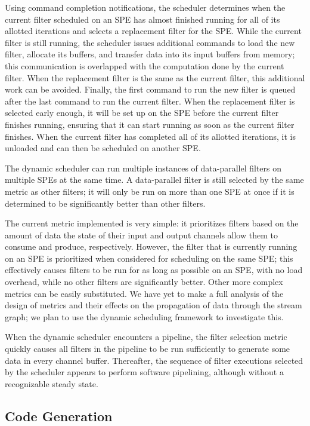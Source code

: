 Using command completion notifications,
the scheduler determines when the current filter scheduled on an SPE has
almost finished running for all of its allotted iterations and selects
a replacement filter for the SPE.
While the current filter is still running, the
scheduler issues additional commands to load the new filter, allocate
its buffers, and transfer data into its input buffers from memory;
this communication is overlapped with the computation done by the
current filter. When the replacement filter is the same as the current
filter, this additional work can be avoided. Finally, the first
command to run the new filter is queued after the last command to run
the current filter. When the replacement filter is selected early
enough, it will be set up on the SPE before the current filter
finishes running, ensuring that it can start running as soon as the
current filter finishes. When the current filter has completed all of
its allotted iterations, it is unloaded and can then be scheduled on
another SPE.

The dynamic scheduler can run multiple instances of data-parallel
filters on multiple SPEs at the same time. A data-parallel filter is
still selected by the same metric as other filters; it will only be
run on more than one SPE at once if it is determined to be significantly better than
other filters.

The current metric implemented is very simple: it prioritizes filters
based on the amount of data the state of their input and output
channels allow them to consume and produce, respectively. However, the
filter that is currently running on an SPE is prioritized when
considered for scheduling on the same SPE; this effectively causes
filters to be run for as long as possible on an SPE, with no load
overhead, while no other filters are significantly better. Other more
complex metrics can be easily substituted. We have yet to make a
full analysis of the design of metrics and their effects on the propagation
of data through the stream graph; we plan to use the dynamic scheduling
framework to investigate this.

When the dynamic scheduler encounters a pipeline, the filter selection
metric quickly causes all filters in the pipeline to be run
sufficiently to generate some data in every channel
buffer. Thereafter, the sequence of filter executions selected by the
scheduler appears to perform software pipelining, although without a
recognizable steady state.

\subsection{Code Generation}

